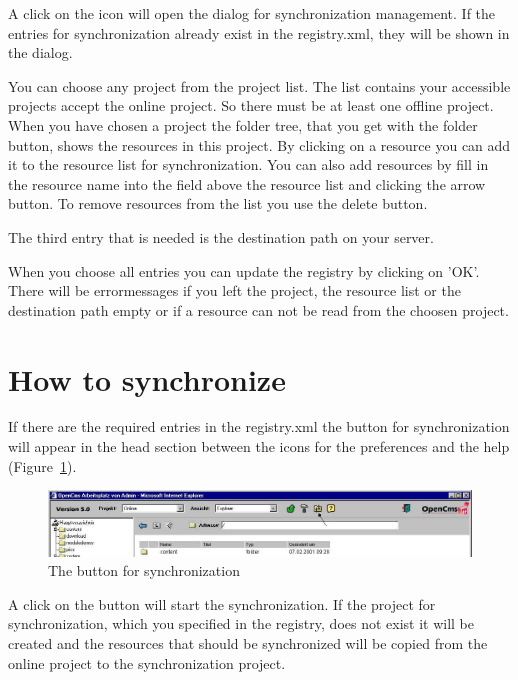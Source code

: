 A click on the icon will open the dialog for synchronization
management. If the entries for synchronization already exist in
the {\dir registry.xml}, they will be shown in the dialog.

You can choose any project from the project list. The list
contains your accessible projects accept the online project. So
there must be at least one offline project. When you have chosen a
project the folder tree, that you get with the folder button,
shows the resources in this project. By clicking on a resource you
can add it to the resource list for synchronization. You can also
add resources by fill in the resource name into the field above
the resource list and clicking the arrow button. To remove
resources from the list you use the delete button.

The third entry that is needed is the destination path on your
server.

When you choose all entries you can update the registry by
clicking on 'OK'. There will be errormessages if you left the
project, the resource list or the destination path empty or if a
resource can not be read from the choosen project.

\section{How to synchronize}

If there are the required entries in the registry.xml the button
for synchronization will appear in the head section between the
icons for the preferences and the help (Figure~\ref{syncicon}).

\begin{figure}[hbt]
\begin{center}
\includegraphics[width=\sgw]
                   {pics/synchronize/syncico}
\caption[The button for synchronization]
           {The button for synchronization}
\label{syncicon}
\end{center}
\end{figure}

A click on the button will start the synchronization. If the project for synchronization, which you specified in the registry, does not exist it will be created and the resources that should be synchronized will be copied from the online project to the synchronization project.

